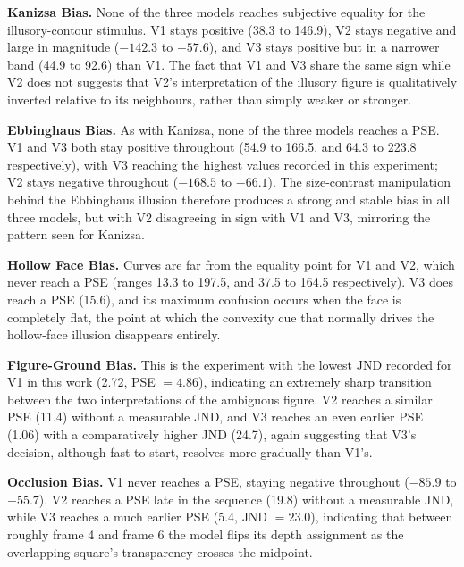 \documentclass[10pt,twocolumn]{article}
\begin{document}
\textbf{Kanizsa Bias.} None of the three models reaches subjective equality for the
illusory-contour stimulus. V1 stays positive (38.3 to 146.9), V2 stays negative and large
in magnitude ($-142.3$ to $-57.6$), and V3 stays positive but in a narrower band (44.9
to 92.6) than V1. The fact that V1 and V3 share the same sign while V2 does not suggests
that V2's interpretation of the illusory figure is qualitatively inverted relative to its
neighbours, rather than simply weaker or stronger.

\textbf{Ebbinghaus Bias.} As with Kanizsa, none of the three models reaches a PSE. V1 and
V3 both stay positive throughout (54.9 to 166.5, and 64.3 to 223.8 respectively), with V3
reaching the highest values recorded in this experiment; V2 stays negative throughout
($-168.5$ to $-66.1$). The size-contrast manipulation behind the Ebbinghaus illusion
therefore produces a strong and stable bias in all three models, but with V2 disagreeing
in sign with V1 and V3, mirroring the pattern seen for Kanizsa.

\textbf{Hollow Face Bias.} Curves are far from the equality point for V1 and V2, which
never reach a PSE (ranges 13.3 to 197.5, and 37.5 to 164.5 respectively). V3 does reach a
PSE (15.6), and its maximum confusion occurs when the face is completely flat, the point
at which the convexity cue that normally drives the hollow-face illusion disappears
entirely.

\textbf{Figure-Ground Bias.} This is the experiment with the lowest JND recorded for V1
in this work (2.72, PSE $=4.86$), indicating an extremely sharp transition between the
two interpretations of the ambiguous figure. V2 reaches a similar PSE (11.4) without a
measurable JND, and V3 reaches an even earlier PSE (1.06) with a comparatively higher
JND (24.7), again suggesting that V3's decision, although fast to start, resolves more
gradually than V1's. \newline

\textbf{Occlusion Bias.} V1 never reaches a PSE, staying negative throughout ($-85.9$ to
$-55.7$). V2 reaches a PSE late in the sequence (19.8) without a measurable JND, while V3
reaches a much earlier PSE (5.4, JND $=23.0$), indicating that between roughly frame 4
and frame 6 the model flips its depth assignment as the overlapping square's transparency
crosses the midpoint.
\end{document}
